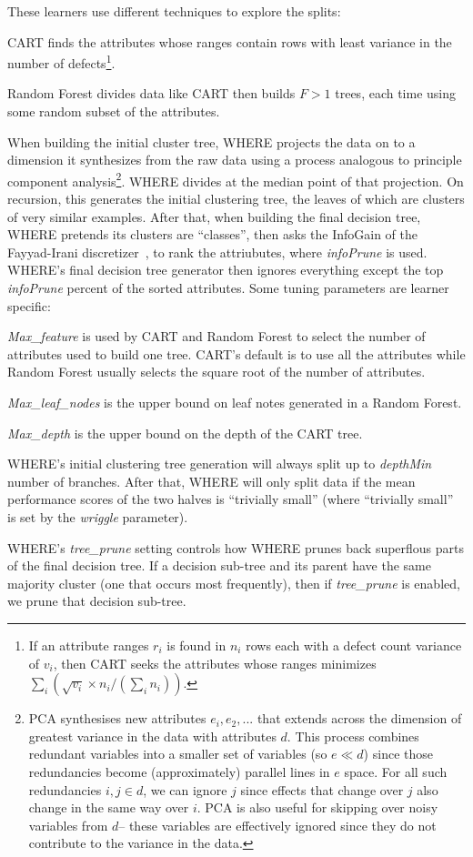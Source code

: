 These learners use different techniques to explore the splits:
\bi
\item
CART finds the attributes whose ranges contain rows with least variance in the number
of defects\footnote{If an attribute ranges $r_i$ is found in 
$n_i$ rows each with a  defect count variance of $v_i$, then CART seeks the attributes
whose ranges minimizes $\sum_i \left(\sqrt{v_i}\times n_i/(\sum_i n_i)\right)$.}.
\item
Random Forest    divides data like CART then  builds $F>1$  trees,
each time using some random subset of
the attributes. 
\item
When building the initial cluster tree, WHERE projects the data on to a dimension it synthesizes from the raw data using
a process analogous to principle component analysis\footnote{
PCA  synthesises  new
attributes $e_i, e_2,...$
that extends across the dimension of greatest  variance in the data  with attributes $d$.  
This process  combines
redundant  variables into a smaller set of variables  (so $e \ll d$) since those
redundancies become (approximately) parallel lines
in $e$ space. For all such redundancies \mbox{$i,j \in d$}, we 
can ignore $j$ 
since effects that change over $j$ also
change in the same way over $i$.
PCA is also useful for skipping over noisy variables from $d$-- these
variables are effectively ignored since    they  do not contribute to the variance in the data.}.
WHERE  divides  at the median point of that projection.
On recursion,
this generates the initial clustering tree, the leaves of which are clusters of  very similar examples. After that, when building 
the final decision tree, WHERE pretends its clusters are ``classes'', then 
asks the InfoGain of the
Fayyad-Irani discretizer~\cite{FayIra93Multi}, to rank the attriubutes, where {\em infoPrune} is used.
WHERE's final decision tree generator then ignores everything except the top   {\em infoPrune} percent of the sorted
attributes.
\ei
Some tuning parameters are learner specific:
\bi
\item
{\em Max\_feature} is used by
CART and Random Forest to select the number of attributes
used to build one tree.
CART's default is to use all the attributes while 
Random Forest usually selects the square root of the number
of attributes.
\item
  {\em Max\_leaf\_nodes} is the upper bound on leaf notes generated in a 
  Random Forest.
\item {\em Max\_depth} is the upper bound on the depth of the CART tree.  
 \item
WHERE's initial clustering
tree generation will always split up to {\em depthMin} number of branches.
After that, WHERE will only split data if the mean performance scores of the two halves
is ``trivially small'' (where ``trivially small'' is set by the   {\em wriggle} parameter). 
\item
WHERE's   {\em tree\_prune} setting controls how   
WHERE prunes back superflous parts of the final decision tree. 
If a decision sub-tree and its parent have the same 
majority cluster
(one that occurs most frequently), then if {\em tree\_prune} is enabled, we prune that decision sub-tree.
\ei





